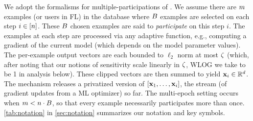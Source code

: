 \documentclass{article}
\begin{document}

 We adopt the formalisms for multiple-participations of \citet{choquette2022multi}. We assume there are $m$ examples (or users in FL) in the database where $B$ examples are selected on each step $i \in [n]$. These $B$ chosen examples are said to \emph{participate} on this step $i$.
The examples at each step are processed via any adaptive function, e.g., computing a gradient of the current model (which depends on the model parameter values). The per-example output vectors are each bounded to $\ell_2$ norm at most $\zeta$ (which, after noting that our notions of sensitivity scale linearly in $\zeta$, WLOG we take to be 1 in analysis below). These clipped vectors are then summed to yield $\mathbf{x}_i \in \mathbb{R}^d$. The \MFFTRL mechanism releases a privatized version of $[\mathbf{x}_1, \dots, \mathbf{x}_i]$, the stream (of gradient updates from a ML optimizer) so far. The multi-epoch setting occurs when $m < n \cdot B$, so that every example necessarily participates more than once. \cref{tab:notation} in \cref{sec:notation} summarizes our notation and key symbols.
\end{document}
